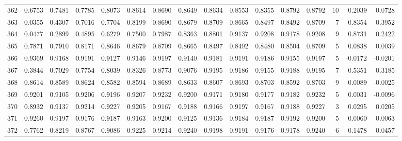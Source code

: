 \begin{tabular}{lrrrrrrrrrrrrrrr}
362 &      0.6753 &  0.7481 &  0.7785 &  0.8073 &  0.8614 &  0.8690 &  0.8649 &  0.8634 &  0.8553 &  0.8355 &   0.8792 &     0.8792 &     10 &                    0.2039 &                     0.0728 \\
363 &      0.0355 &  0.4307 &  0.7016 &  0.7704 &  0.8199 &  0.8690 &  0.8679 &  0.8709 &  0.8665 &  0.8497 &   0.8492 &     0.8709 &      7 &                    0.8354 &                     0.3952 \\
364 &      0.0477 &  0.2899 &  0.4895 &  0.6279 &  0.7500 &  0.7987 &  0.8363 &  0.8801 &  0.9137 &  0.9208 &   0.9178 &     0.9208 &      9 &                    0.8731 &                     0.2422 \\
365 &      0.7871 &  0.7910 &  0.8171 &  0.8646 &  0.8679 &  0.8709 &  0.8665 &  0.8497 &  0.8492 &  0.8480 &   0.8504 &     0.8709 &      5 &                    0.0838 &                     0.0039 \\
366 &      0.9369 &  0.9168 &  0.9191 &  0.9127 &  0.9146 &  0.9197 &  0.9140 &  0.9181 &  0.9191 &  0.9186 &   0.9155 &     0.9197 &      5 &                   -0.0172 &                    -0.0201 \\
367 &      0.3844 &  0.7029 &  0.7754 &  0.8039 &  0.8326 &  0.8773 &  0.9076 &  0.9195 &  0.9186 &  0.9155 &   0.9188 &     0.9195 &      7 &                    0.5351 &                     0.3185 \\
368 &      0.8614 &  0.8589 &  0.8624 &  0.8582 &  0.8594 &  0.8689 &  0.8633 &  0.8607 &  0.8693 &  0.8703 &   0.8592 &     0.8703 &      9 &                    0.0089 &                    -0.0025 \\
369 &      0.9201 &  0.9105 &  0.9206 &  0.9196 &  0.9207 &  0.9232 &  0.9200 &  0.9171 &  0.9180 &  0.9177 &   0.9182 &     0.9232 &      5 &                    0.0031 &                    -0.0096 \\
370 &      0.8932 &  0.9137 &  0.9214 &  0.9227 &  0.9205 &  0.9167 &  0.9188 &  0.9166 &  0.9197 &  0.9167 &   0.9188 &     0.9227 &      3 &                    0.0295 &                     0.0205 \\
371 &      0.9260 &  0.9197 &  0.9176 &  0.9187 &  0.9163 &  0.9200 &  0.9125 &  0.9136 &  0.9184 &  0.9187 &   0.9192 &     0.9200 &      5 &                   -0.0060 &                    -0.0063 \\
372 &      0.7762 &  0.8219 &  0.8767 &  0.9086 &  0.9225 &  0.9214 &  0.9240 &  0.9198 &  0.9191 &  0.9176 &   0.9178 &     0.9240 &      6 &                    0.1478 &                     0.0457 \\

\end{tabular}
